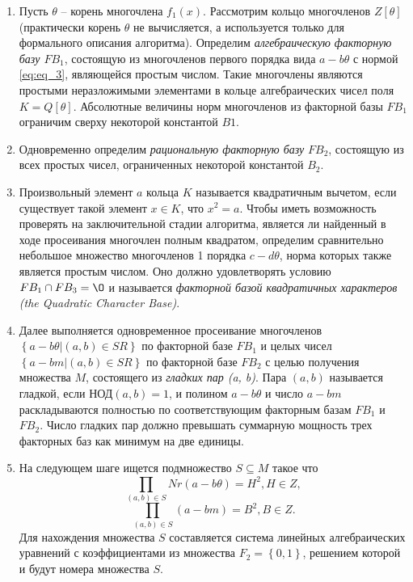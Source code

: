 \documentclass[a4paper,12pt]{article}
\begin{document}
\begin{enumerate}
    \item Пусть $\theta$ -- корень многочлена $f_1(x)$. Рассмотрим кольцо
    многочленов $Z[\theta]$ (практически корень $\theta$ не вычисляется, а используется только
    для формального описания алгоритма). Определим \textit{алгебраическую факторную базу $FB_1$},
    состоящую из многочленов первого порядка вида $a - b\theta$ с нормой \ref{eq:eq_3},
    являющейся простым числом. Такие многочлены являются простыми неразложимыми элементами
    в кольце алгебраических чисел поля $K = Q[\theta]$. Абсолютные величины норм многочленов
    из факторной базы $FB_1$ ограничим сверху некоторой константой $B1$.

    \item Одновременно определим \textit{рациональную факторную базу} $FB_2$,
    состоящую из всех простых чисел, ограниченных некоторой константой $B_2$.

    \item Произвольный элемент $a$ кольца $K$ называется квадратичным вычетом,
    если существует такой элемент $x \in K$, что $x^2 = a$. Чтобы иметь возможность
    проверять на заключительной стадии алгоритма, является ли найденный в ходе просеивания
    многочлен полным квадратом, определим сравнительно небольшое множество многочленов
    1 порядка $c - d\theta$, норма которых также является простым числом.
    Оно должно удовлетворять условию $FB_1 \cap FB_3 = \O$ и называется \textit{факторной
    базой квадратичных характеров (the Quadratic Character Base)}.

    \item Далее выполняется одновременное просеивание многочленов
    $ \left \{a - b\theta | (a, b) \in SR \right \}$ по факторной
    базе $FB_1$ и целых чисел
    $ \left \{a - bm | (a, b) \in SR \right \}$ по факторной базе $FB_2$
    с целью получения множества $M$, состоящего из \textit{гладких пар (a, b)}.
    Пара $(a, b)$ называется гладкой, если НОД$(a, b) = 1$, и полином $a - b\theta$
    и число $a - bm$ раскладываются полностью по соответствующим факторным базам
    $FB_1$ и $FB_2$. Число гладких пар должно превышать суммарную мощность
    трех факторных баз как минимум на две единицы.

    \item На следующем шаге ищется подмножество $S \subseteq M$ такое что
    $$\prod_{(a, b) \in S}Nr(a - b\theta) = H^2, H \in Z,$$
    $$\prod_{(a, b) \in S}(a - bm) = B^2, B \in Z.$$
    Для нахождения множества $S$ составляется система линейных алгебраических
    уравнений с коэффициентами из множества $F_2 = \left \{ 0, 1 \right \}$,
    решением которой и будут номера множества $S$.


\end{enumerate}
\end{document}
